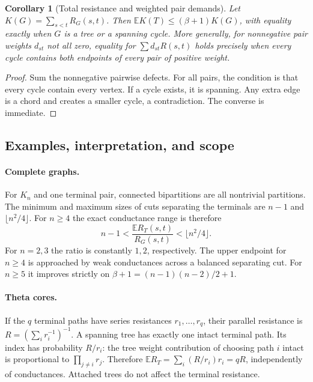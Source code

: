 \documentclass[11pt,a4paper]{article}
\newtheorem{corollary}[theorem]{Corollary}
\theoremstyle{definition}\newtheorem{definition}[theorem]{Definition}
\theoremstyle{remark}\newtheorem{remark}[theorem]{Remark}
\numberwithin{equation}{section}
\begin{document}
\begin{corollary}[Total resistance and weighted pair demands]
Let $K(G)=\sum_{s<t}R_G(s,t)$. Then
$\mathbb E K(T)\le(\beta+1)K(G)$, with equality exactly when $G$ is a tree or a spanning cycle. More generally, for nonnegative pair weights $d_{st}$ not all zero, equality for $\sum d_{st}R(s,t)$ holds precisely when every cycle contains both endpoints of every pair of positive weight.
\end{corollary}
\begin{proof}
Sum the nonnegative pairwise defects. For all pairs, the condition is that every cycle contain every vertex. If a cycle exists, it is spanning. Any extra edge is a chord and creates a smaller cycle, a contradiction. The converse is immediate.
\end{proof}

\subsection{Examples, interpretation, and scope}\label{T06-sec-4}
\paragraph{Complete graphs.}
For $K_n$ and one terminal pair, connected bipartitions are all nontrivial partitions. The minimum and maximum sizes of cuts separating the terminals are $n-1$ and $\lfloor n^2/4\rfloor$. For $n\ge4$ the exact conductance range is therefore
\[
 n-1<\frac{\mathbb E R_T(s,t)}{R_G(s,t)}<\lfloor n^2/4\rfloor.
\]
For $n=2,3$ the ratio is constantly $1,2$, respectively. The upper endpoint for $n\ge4$ is approached by weak conductances across a balanced separating cut. For $n\ge5$ it improves strictly on $\beta+1=(n-1)(n-2)/2+1$.

\paragraph{Theta cores.}
If the $q$ terminal paths have series resistances $r_1,\ldots,r_q$, their parallel resistance is $R=(\sum_i r_i^{-1})^{-1}$. A spanning tree has exactly one intact terminal path. Its index has probability $R/r_i$: the tree weight contribution of choosing path $i$ intact is proportional to $\prod_{j\ne i}r_j$. Therefore $\mathbb E R_T=\sum_i (R/r_i)r_i=qR$, independently of conductances. Attached trees do not affect the terminal resistance.
\end{document}
